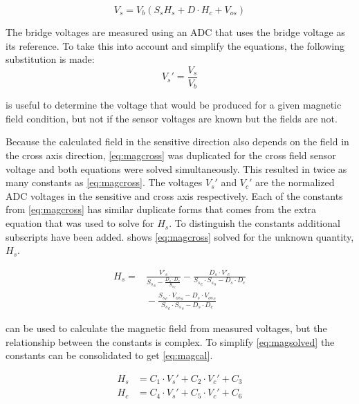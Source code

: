 \begin{equation}
    V_s = V_b \left(S_s H_s + D \cdot H_c + V_{os} \right)
    \label{eq:magcross}
\end{equation}
 
The bridge voltages are measured using an \ac{ADC} that uses the bridge voltage as its reference. To take this into account and simplify the equations, the following substitution is made:
\begin{equation}
    V_s'=\frac{V_s}{V_b}
    \label{eq:adcsub}
\end{equation}

 is useful to determine the voltage that would be produced for a given magnetic field condition, but not if the sensor voltages are known but the fields are not.

Because the calculated field in the sensitive direction also depends on the field in the cross axis direction, \cref{eq:magcross} was duplicated for the cross field sensor voltage and both equations were solved simultaneously. This resulted in twice as many constants as \cref{eq:magcross}. The voltages $V_s'$ and $V_c'$ are the normalized \ac{ADC} voltages in the sensitive and cross axis respectively. Each of the constants from \cref{eq:magcross} has similar duplicate forms that comes from the extra equation that was used to solve for $H_s$. To distinguish the constants additional subscripts have been added.  shows \cref{eq:magcross} solved for the unknown quantity, $H_s$.

\begin{equation}
    \begin{split}
    H_s = & \frac{V'_s }{{S_s}_s - \frac{D_s \cdot D_c}{{S_s}_c}} - \frac{D_s \cdot  V'_c }{{S_s}_c \cdot {S_s}_s - D_s \cdot D_c}\\
    & {}- \frac{{S_s}_c \cdot {V_{os}}_s  -D_s \cdot {V_{os}}_c}{{S_s}_c \cdot {S_s}_s - D_s \cdot D_c}
    \end{split}
    \label{eq:magsolved} 
\end{equation}

 can be used to calculate the magnetic field from measured voltages, but the relationship between the constants is complex. To simplify \cref{eq:magsolved} the constants can be consolidated to get \cref{eq:magcal}.

\begin{equation}
    \label{eq:magcal}
    \begin{split}
        H_s &= C_1 \cdot V_s' + C_2 \cdot V_c' + C_3\\
        H_c &= C_4 \cdot V_s' + C_5 \cdot V_c' + C_6
    \end{split}
\end{equation}

